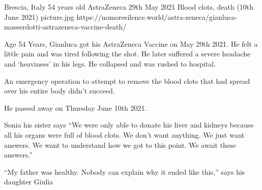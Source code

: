 {Brescia, Italy}
{54 years old}
{AstraZeneca}
{29th May 2021}
{Blood clots, death (10th June 2021)}
{picture.jpg}
{https://nomoresilence.world/astra-zeneca/gianluca-masserdotti-astrazeneca-vaccine-death/}
{

Age 54 Years, Gianluca got his AstraZeneca Vaccine on May 29th 2021. He felt a
little pain and was tired following the shot. He later suffered a severe
headache and ‘heaviness’ in his legs. He collapsed and was rushed to hospital.

An emergency operation to attempt to remove the blood clots that had spread over
his entire body didn’t succeed.

He passed away on Thursday June 10th 2021.

Sonia his sister says “We were only able to donate his liver and kidneys because
all his organs were full of blood clots. We don’t want anything. We just want
answers. We want to understand how we got to this point. We await these
answers.”

“My father was healthy. Nobody can explain why it ended like this,” says his
daughter Giulia

}
